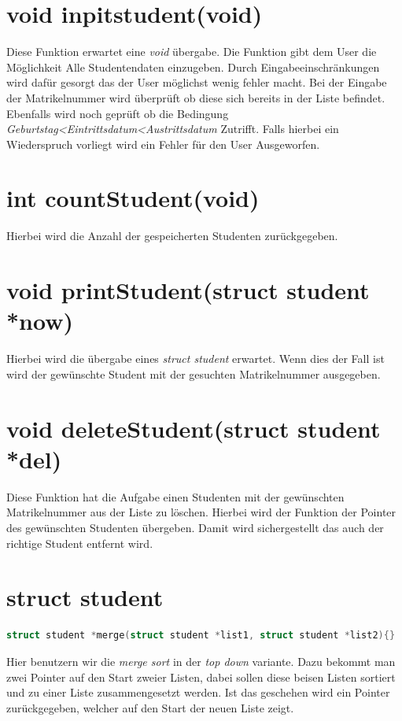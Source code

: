 \documentclass[a4paper, 11pt, oneside]{book} %
\begin{document}
\section{void inpitstudent(void)}
Diese Funktion erwartet eine \textit{void} übergabe. Die Funktion gibt dem User die Möglichkeit Alle Studentendaten einzugeben. Durch Eingabeeinschränkungen wird dafür gesorgt das der User möglichst wenig fehler macht. \newline Bei der Eingabe der Matrikelnummer wird überprüft ob diese sich bereits in der Liste befindet. Ebenfalls wird noch geprüft ob die Bedingung \textit{Geburtstag<Eintrittsdatum<Austrittsdatum} Zutrifft. Falls hierbei ein Wiederspruch vorliegt wird ein Fehler für den User Ausgeworfen.
\section{int countStudent(void)}
Hierbei wird die Anzahl der gespeicherten Studenten zurückgegeben.
\section{void printStudent(struct student *now)}
Hierbei wird die übergabe eines \textit{struct student} erwartet. Wenn dies der Fall ist wird der gewünschte Student mit der gesuchten Matrikelnummer ausgegeben.

\section{void deleteStudent(struct student *del)}
Diese Funktion hat die Aufgabe einen Studenten mit der gewünschten Matrikelnummer aus der Liste zu löschen. Hierbei wird der Funktion der Pointer des gewünschten Studenten übergeben. Damit wird sichergestellt das auch der richtige Student entfernt wird.

\section{struct student}
\begin{lstlisting}[language=C]
	struct student *merge(struct student *list1, struct student *list2){}
\end{lstlisting}
Hier benutzern wir die \textit{merge sort} in der \textit{top down} variante. Dazu bekommt man zwei Pointer auf den Start zweier Listen, dabei sollen diese beisen Listen sortiert und zu einer Liste zusammengesetzt werden. Ist das geschehen wird ein Pointer zurückgegeben, welcher auf den Start der neuen Liste zeigt.
\end{document}
